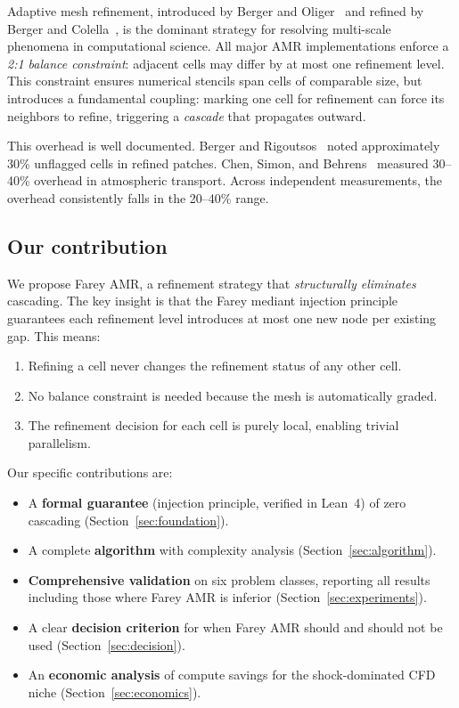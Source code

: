 \documentclass[11pt]{article}
\theoremstyle{definition}
\begin{document}
Adaptive mesh refinement, introduced by Berger and
Oliger~\cite{BergerOliger1984} and refined by Berger and
Colella~\cite{BergerColella1989}, is the dominant strategy for
resolving multi-scale phenomena in computational science. All major
AMR implementations enforce a \emph{2:1 balance constraint}:
adjacent cells may differ by at most one refinement level. This
constraint ensures numerical stencils span cells of comparable
size, but introduces a fundamental coupling: marking one cell for
refinement can force its neighbors to refine, triggering a
\emph{cascade} that propagates outward.

This overhead is well documented. Berger and
Rigoutsos~\cite{BergerRigoutsos1991} noted approximately 30\%
unflagged cells in refined patches. Chen, Simon, and
Behrens~\cite{ChenSimonBehrens2021} measured 30--40\% overhead
in atmospheric transport. Across independent measurements, the
overhead consistently falls in the 20--40\% range.

\subsection{Our contribution}

We propose Farey AMR, a refinement strategy that \emph{structurally
eliminates} cascading. The key insight is that the Farey mediant
injection principle guarantees each refinement level introduces at
most one new node per existing gap. This means:
\begin{enumerate}
\item Refining a cell never changes the refinement status of any
  other cell.
\item No balance constraint is needed because the mesh is
  automatically graded.
\item The refinement decision for each cell is purely local,
  enabling trivial parallelism.
\end{enumerate}

Our specific contributions are:
\begin{itemize}
\item A \textbf{formal guarantee} (injection principle, verified in
  Lean~4) of zero cascading (Section~\ref{sec:foundation}).
\item A complete \textbf{algorithm} with complexity analysis
  (Section~\ref{sec:algorithm}).
\item \textbf{Comprehensive validation} on six problem classes,
  reporting all results including those where Farey AMR is inferior
  (Section~\ref{sec:experiments}).
\item A clear \textbf{decision criterion} for when Farey AMR should
  and should not be used (Section~\ref{sec:decision}).
\item An \textbf{economic analysis} of compute savings for the
  shock-dominated CFD niche (Section~\ref{sec:economics}).
\end{itemize}
\end{document}
